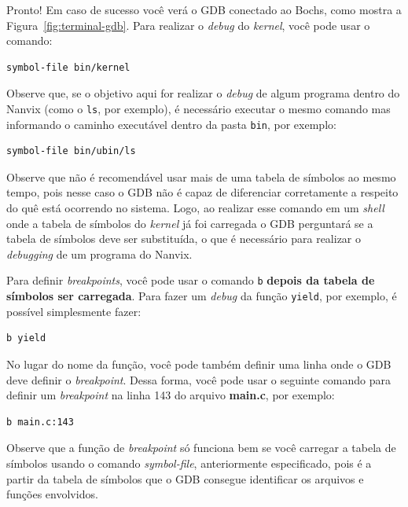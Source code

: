 \documentclass[11pt]{article}
\begin{document}
Pronto! Em caso de sucesso você verá o GDB conectado ao Bochs, como mostra a Figura~\ref{fig:terminal-gdb}. Para realizar o \textit{debug} do \textit{kernel}, você pode usar o comando:\\

\begin{lstlisting}[language=sh,numbers=none,frame=single]
symbol-file bin/kernel
\end{lstlisting}

Observe que, se o objetivo aqui for realizar o \textit{debug} de algum programa dentro do Nanvix (como o \texttt{ls}, por exemplo), é necessário executar o mesmo comando mas informando o caminho executável dentro da pasta \texttt{bin}, por exemplo:\\

\begin{lstlisting}[language=sh,numbers=none,frame=single]
symbol-file bin/ubin/ls
\end{lstlisting}

Observe que não é recomendável usar mais de uma tabela de símbolos ao mesmo tempo, pois nesse caso o GDB não é capaz de diferenciar corretamente a respeito do quê está ocorrendo no sistema. Logo, ao realizar esse comando em um \textit{shell} onde a tabela de símbolos do \textit{kernel} já foi carregada o GDB perguntará se a tabela de símbolos deve ser substituída, o que é necessário para realizar o \textit{debugging} de um programa do Nanvix.

Para definir \textit{breakpoints}, você pode usar o comando \texttt{b} \textbf{depois da tabela de símbolos ser carregada}. Para fazer um \textit{debug} da função \texttt{yield}, por exemplo, é possível simplesmente fazer:\\

\begin{lstlisting}[language=sh,numbers=none,frame=single]
b yield
\end{lstlisting}

No lugar do nome da função, você pode também definir uma linha onde o GDB deve definir o \textit{breakpoint}. Dessa forma, você pode usar o seguinte comando para definir um \textit{breakpoint} na linha 143 do arquivo \textbf{main.c}, por exemplo:\\

\begin{lstlisting}[language=sh,numbers=none,frame=single]
b main.c:143
\end{lstlisting}

Observe que a função de \textit{breakpoint} só funciona bem se você carregar a tabela de símbolos usando o comando \textit{symbol-file}, anteriormente especificado, pois é a partir da tabela de símbolos que o GDB consegue identificar os arquivos e funções envolvidos.
\end{document}

